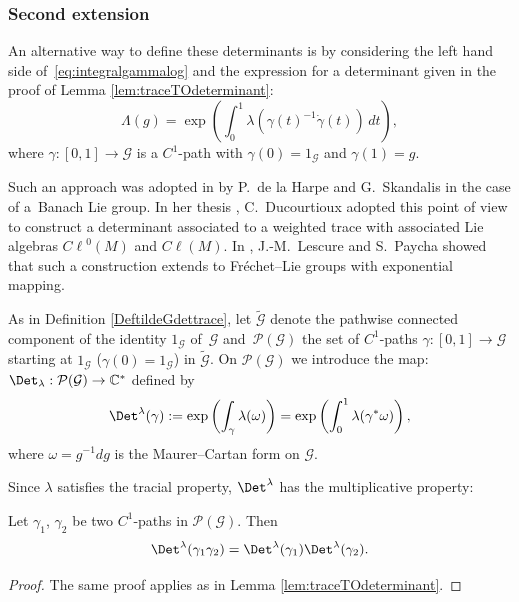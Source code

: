 \documentclass[pdftex]{sigma}
\def \Cl {{C\ell}}
\begin{document}
\subsubsection{Second extension}\label{subsectionsecondextension}

An alternative way to def\/ine these determinants is by considering the left hand side of~\eqref{eq:integralgammalog} and the expression for a determinant given in the proof of Lemma \ref{lem:traceTOdeterminant}:
\[
\Lambda(g)={\exp}\left(\int_0^1\lambda(\gamma(t)^{-1}\dot{\gamma}(t))\,dt\right),
\]
where $\gamma:[0,1]\to {\mathcal{G}}$ is a $C^1$-path with $\gamma(0)=1_{\mathcal{G}}$ and $\gamma(1)=g$.

Such an approach was adopted in \cite{HarpeSkandalis} by P.~de la Harpe and G.~Skandalis in  the case of a~Banach Lie group. In her thesis \cite{ducourtiouxthese}, C.~Ducourtioux adopted this point of view to construct a determinant associated to a weighted trace with associated Lie algebras $\Cl^{0}(M)$ and $\Cl(M)$. In \cite{lescure}, J.-M.~Lescure and S.~Paycha showed that such a construction extends to Fr\'echet--Lie groups with exponential mapping.

As in Def\/inition \ref{DeftildeGdettrace}, let $\widetilde{\mathcal{G}}$ denote the pathwise connected component of the identity $1_{\mathcal{G}}$ of~${\mathcal{G}}$ and~${\mathcal{P}}(\mathcal{G})$ the set of $C^1$-paths $\gamma:[0,1]\to{\mathcal{G}}$ starting at $1_{\mathcal{G}}$ ($\gamma(0)=1_{\mathcal{G}}$) in $\widetilde{\mathcal{G}}$. On ${\mathcal{P}}(\mathcal{G})$ we introduce the map: $\Det_\lambda:{\mathcal{P}}(\mathcal{G})\to \mathbb{C}^*$ def\/ined by{\samepage
\begin{gather}
\Det^\lambda(\gamma):= {\exp}\left( \int_\gamma \lambda(\omega)\right)={\exp}\left(\int_0^1 \lambda(\gamma^*\omega)\right), \label{Detlambdagamma}
\end{gather}
where $\omega= g^{-1} dg$ is the Maurer--Cartan form on ${\mathcal{G}}$.}

Since $\lambda$ satisf\/ies the tracial property, $\Det^\lambda$ has the multiplicative property:

\begin{lemma}\label{lema:MultiplicativityDet}
Let $\gamma_1$, $\gamma_2$ be two $C^1$-paths in ${\mathcal{P}}(\mathcal{G})$. Then
\[
\Det^\lambda(\gamma_1\gamma_2)=\Det^\lambda(\gamma_1)\Det^\lambda(\gamma_2).
\]
\end{lemma}

\begin{proof}
The same proof applies as in Lemma \ref{lem:traceTOdeterminant}.
\end{proof}
\end{document}
